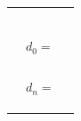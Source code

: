 \documentclass[12pt]{amsart}
\numberwithin{equation}{section}
\begin{document}
\begin{center}
\begin{tabular}{|llp{8cm}|}
	&& \\
	&& \\
	&& \\
	&& \\
	&& \\
	&& \\
	& $d_0 = $ & \\
	&& \\
	&& \\
	&& \\
	&& \\
	& $d_n = $ & \\
	&& \\
	&& \\
	&& \\
	\hline
\end{tabular}

\end{center}
\end{document}
